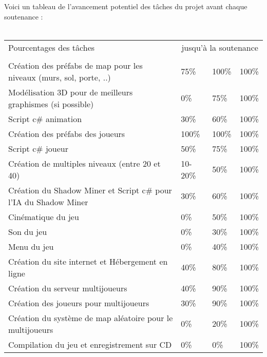 \documentclass[titlepage, 13px, a4paper]{article}
\begin{document}
\paragraph{} \hspace{0pt} \\ 
Voici un tableau de l'avancement potentiel des tâches du projet avant chaque soutenance :
\\ \\
{\small
	\begin{tabular}{|p{7.2cm}|p{1.2cm}|p{1.2cm}|p{1.2cm}|}
		\hline
		Pourcentages des tâches & \multicolumn{3}{|c|}{jusqu'à la soutenance} \\ 
		\cline{2-4}
			& \no 1 & \no 2 & \no 3 \\
		\hline
		Création des préfabs de map pour les niveaux (murs, sol, porte, ..) & 75\% & 100\% & 100\% \\
		\hline
		Modélisation 3D pour de meilleurs graphismes (si possible) & 0\% & 75\% & 100\% \\
		\hline
		Script c\# animation & 30\% & 60\% & 100\% \\
		\hline
		Création des préfabs des joueurs & 100\% & 100\% & 100\% \\
		\hline
		Script c\# joueur & 50\% & 75\% & 100\% \\
		\hline
		Création de multiples niveaux (entre 20 et 40) & 10-20\% & 50\% & 100\% \\
		\hline
		Création du Shadow Miner et Script c\# pour l'IA du Shadow Miner & 30\% & 60\% & 100\% \\
		\hline
		Cinématique du jeu & 0\% & 50\% & 100\% \\
		\hline
		Son du jeu & 0\% & 30\% & 100\% \\
		\hline
		Menu du jeu & 0\% & 40\% & 100\% \\
		\hline
		Création du site internet et Hébergement en ligne & 40\% & 80\% & 100\% \\
		\hline
		Création du serveur multijoueurs & 40\% & 90\% & 100\% \\
		\hline
		Création des joueurs pour multijoueurs & 30\% & 90\% & 100\% \\
		\hline
		Création du système de map aléatoire pour le multijoueurs & 0\% & 20\% & 100\% \\
		\hline
		Compilation du jeu et enregistrement sur CD & 0\% & 0\% & 100\% \\
		\hline 
		\end{tabular}
	\label{repartition}	
}
\end{document}
